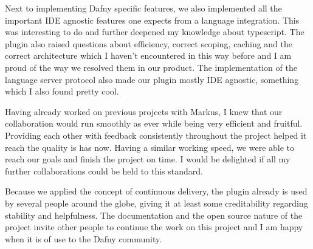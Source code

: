 Next to implementing Dafny specific features, we also implemented all the important IDE agnostic features one expects from a language integration. This was interesting to do and further deepened my knowledge about typescript. The plugin also raised questions about efficiency, correct scoping, caching and the correct architecture which I haven't encountered in this way before and I am proud of the way we resolved them in our product. The implementation of the language server protocol also made our plugin mostly IDE agnostic, something which I also found pretty cool. \newline 

Having already worked on previous projects with Markus, I knew that our collaboration would run smoothly as ever while being very efficient and fruitful. Providing each other with feedback consistently throughout the project helped it reach the quality is has now. Having a similar working speed, we were able to reach our goals and finish the project on time. I would be delighted if all my further collaborations could be held to this standard. \newline

Because we applied the concept of continuous delivery, the plugin already is used by several people around the globe, giving it at least some creditability regarding stability and helpfulness. The documentation and the open source nature of the project invite other people to continue the work on this project and I am happy when it is of use to the Dafny community. 
